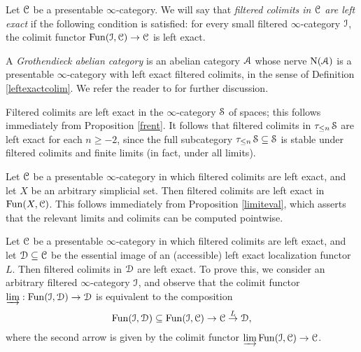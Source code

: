 \begin{definition}\label{leftexactcolim}
Let $\operatorname{\mathcal{C}}$ be a presentable $\infty$-category. We will say that {\it filtered colimits
in $\operatorname{\mathcal{C}}$ are left exact} if the following condition is satisfied: for every small filtered $\infty$-category $\operatorname{\mathcal{I}}$, the colimit functor $\operatorname{Fun}(\operatorname{\mathcal{I}},\operatorname{\mathcal{C}}) \rightarrow \operatorname{\mathcal{C}}$
is left exact.
\end{definition}

\begin{example}
A {\it Grothendieck abelian category} is an abelian category $\operatorname{\mathcal{A}}$ whose nerve 
$\operatorname{N}(\operatorname{\mathcal{A}})$ is a presentable $\infty$-category with left exact filtered colimits, in the sense of Definition \ref{leftexactcolim}. We refer the reader to \cite{tohoku} for further discussion.
\end{example}

\begin{example}\label{sumta1}
Filtered colimits are left exact in the $\infty$-category $\operatorname{\mathcal{S}}$ of spaces; this follows immediately from Proposition \ref{frent}. It follows that filtered colimits in $\tau_{\leq n} \operatorname{\mathcal{S}}$ are left exact for each $n \geq -2$, since the full subcategory $\tau_{ \leq n} \operatorname{\mathcal{S}} \subseteq \operatorname{\mathcal{S}}$ is stable under filtered colimits and finite limits (in fact, under all limits).
\end{example}

\begin{example}\label{sumta2}
Let $\operatorname{\mathcal{C}}$ be a presentable $\infty$-category in which filtered colimits are left exact, and let $X$ be an arbitrary simplicial set. Then filtered colimits are left exact in $\operatorname{Fun}(X,\operatorname{\mathcal{C}})$. This follows
immediately from Proposition \ref{limiteval}, which asserts that the relevant limits and colimits can be computed pointwise.
\end{example}

\begin{example}\label{sumta3}
Let $\operatorname{\mathcal{C}}$ be a presentable $\infty$-category in which filtered colimits are left exact, and let
$\operatorname{\mathcal{D}} \subseteq \operatorname{\mathcal{C}}$ be the essential image of an (accessible) left exact localization functor $L$. Then filtered colimits in $\operatorname{\mathcal{D}}$ are left exact. To prove this, we consider an arbitrary filtered $\infty$-category $\operatorname{\mathcal{I}}$, and observe that the colimit functor $\varinjlim: \operatorname{Fun}(\operatorname{\mathcal{I}}, \operatorname{\mathcal{D}}) \rightarrow \operatorname{\mathcal{D}}$ is equivalent to the composition
$$ \operatorname{Fun}(\operatorname{\mathcal{I}}, \operatorname{\mathcal{D}}) \subseteq \operatorname{Fun}(\operatorname{\mathcal{I}},\operatorname{\mathcal{C}}) \rightarrow \operatorname{\mathcal{C}} \stackrel{L}{\rightarrow} \operatorname{\mathcal{D}},$$
where the second arrow is given by the colimit functor $\varinjlim \operatorname{Fun}(\operatorname{\mathcal{I}},\operatorname{\mathcal{C}}) \rightarrow \operatorname{\mathcal{C}}$.
\end{example}

